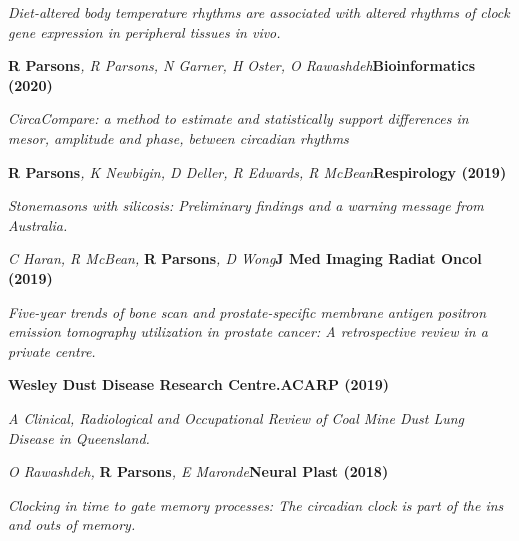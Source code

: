     \textit{Diet-altered body temperature rhythms are associated with altered rhythms of clock gene expression in peripheral tissues in vivo.}
\item
    \textbf{R Parsons}\textit{, R Parsons, N Garner, H Oster, O Rawashdeh}\textbf{\hfill Bioinformatics (2020)}\par 
    \textit{CircaCompare: a method to estimate and statistically support differences in mesor, amplitude and phase, between circadian rhythms}
\item
    \textbf{R Parsons}\textit{, K Newbigin, D Deller, R Edwards, R McBean}\textbf{\hfill Respirology (2019)}\par 
    \textit{Stonemasons with silicosis: Preliminary findings and a warning message from Australia.}
\item
    \textit{C Haran, R McBean, }\textbf{R Parsons}\textit{, D Wong}\textbf{\hfill J Med Imaging Radiat Oncol (2019)}\par 
    \textit{Five-year trends of bone scan and prostate-specific membrane antigen positron emission tomography utilization in prostate cancer: A retrospective review in a private centre.}
\item
    \textbf{Wesley Dust Disease Research Centre.}\textbf{\hfill ACARP (2019)}\par 
    \textit{A Clinical, Radiological and Occupational Review of Coal Mine Dust Lung Disease in Queensland.}
\item
    \textit{O Rawashdeh, }\textbf{R Parsons}\textit{, E Maronde}\textbf{\hfill Neural Plast (2018)}\par 
    \textit{Clocking in time to gate memory processes: The circadian clock is part of the ins and outs of memory.}
